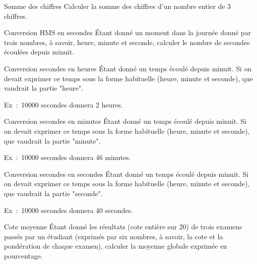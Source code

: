 \begin{Exercice}{Somme des chiffres}
	Calculer la somme des chiffres
	d’un nombre entier de 3 chiffres.
\end{Exercice}

\begin{Exercice}{Conversion HMS en secondes}
	Étant donné un moment dans la journée donné
	par trois nombres, à savoir, heure, minute et seconde, calculer le
	nombre de secondes écoulées depuis minuit.
\end{Exercice}

\begin{Exercice}{Conversion secondes en heures}
	Étant donné un temps écoulé depuis minuit.
	Si on devait exprimer ce temps sous la forme
	habituelle (heure, minute et seconde),
	que vaudrait la partie "heure".

	Ex~:~10000 secondes donnera 2 heures.
\end{Exercice}

\begin{Exercice}{Conversion secondes en minutes}
	Étant donné un temps écoulé depuis minuit.
	Si on devait exprimer ce temps sous la forme
	habituelle (heure, minute et seconde),
	que vaudrait la partie "minute".

	Ex~:~10000 secondes donnera 46 minutes.
\end{Exercice}

\begin{Exercice}{Conversion secondes en secondes}
	Étant donné un temps écoulé depuis minuit.
	Si on devait exprimer ce temps sous la forme
	habituelle (heure, minute et seconde),
	que vaudrait la partie "seconde".

	Ex~:~10000 secondes donnera 40 secondes.
\end{Exercice}	

\begin{Exercice}{Cote moyenne}
	Étant donné les résultats (cote entière sur
	20) de trois examens passés par un étudiant (exprimés par six nombres,
	à savoir, la cote et la pondération de chaque examen), calculer 
	la moyenne globale exprimée en pourcentage.
\end{Exercice}

